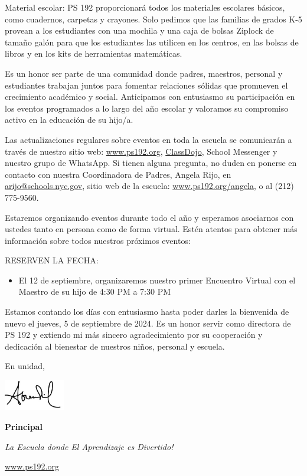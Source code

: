 \documentclass[letterpaper, 12pt]{article}
\begin{document}
Material escolar: PS 192 proporcionará todos los materiales escolares básicos, como cuadernos, carpetas y crayones. Solo pedimos que las familias de grados K-5 provean a los estudiantes con una mochila y una caja de bolsas Ziplock de tamaño galón para que los estudiantes las utilicen en los centros, en las bolsas de libros y en los kits de herramientas matemáticas.

Es un honor ser parte de una comunidad donde padres, maestros, personal y estudiantes trabajan juntos para fomentar relaciones sólidas que promueven el crecimiento académico y social. Anticipamos con entusiasmo su participación en los eventos programados a lo largo del año escolar y valoramos su compromiso activo en la educación de su hijo/a.

Las actualizaciones regulares sobre eventos en toda la escuela se comunicarán a través de nuestro sitio web: \href{https://www.ps192.org}{www.ps192.org}, \href{https://www.classdojo.com/}{ClassDojo}, School Messenger y nuestro grupo de WhatsApp. Si tienen alguna pregunta, no duden en ponerse en contacto con nuestra Coordinadora de Padres, Angela Rijo, en \href{mailto:arijo@schools.nyc.gov}{arijo@schools.nyc.gov}, sitio web de la escuela: \href{https://www.ps192.org/angela}{www.ps192.org/angela}, o al (212) 775-9560.

Estaremos organizando eventos durante todo el año y esperamos asociarnos con ustedes tanto en persona como de forma virtual. Estén atentos para obtener más información sobre todos nuestros próximos eventos:

\pagebreak
\vspace*{2cm}

RESERVEN LA FECHA:

\begin{itemize}
    \item El 12 de septiembre, organizaremos nuestro primer Encuentro Virtual con el Maestro de su hijo de 4:30 PM a 7:30 PM
\end{itemize}

Estamos contando los días con entusiasmo hasta poder darles la bienvenida de nuevo el jueves, 5 de septiembre de 2024. Es un honor servir como directora de PS 192 y extiendo mi más sincero agradecimiento por su cooperación y dedicación al bienestar de nuestros niños, personal y escuela.

En unidad,

\includegraphics[width=0.2\textwidth]{hil_signature}

\textbf{Principal}

\textit{La Escuela donde El Aprendizaje es Divertido!}

\href{https://www.ps192.org}{www.ps192.org}
\end{document}

